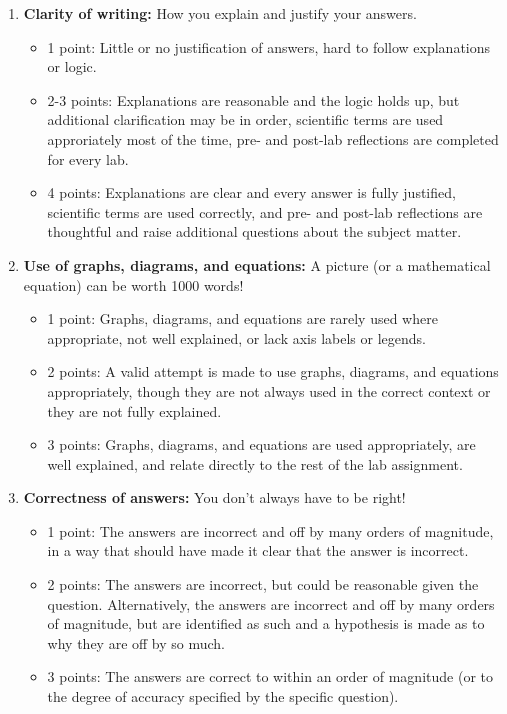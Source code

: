 \documentclass[10pt]{article}
\begin{document}
\begin{enumerate}
\item \textbf{Clarity of writing:} How you explain and justify your answers.
\begin{itemize}
	\item 1 point: Little or no justification of answers, hard to follow explanations or logic.
	\item 2-3 points: Explanations are reasonable and the logic holds up, but additional clarification may be in order, scientific terms are used approriately most of the time, pre- and post-lab reflections are completed for every lab.
	\item 4 points: Explanations are clear and every answer is fully justified, scientific terms are used correctly, and pre- and post-lab reflections are thoughtful and raise additional questions about the subject matter.
\end{itemize}
\item \textbf{Use of graphs, diagrams, and equations:} A picture (or a mathematical equation) can be worth 1000 words!
\begin{itemize}
	\item 1 point: Graphs, diagrams, and equations are rarely used where appropriate, not well explained, or lack axis labels or legends.
	\item 2 points: A valid attempt is made to use graphs, diagrams, and equations appropriately, though they are not always used in the correct context or they are not fully explained.
	\item 3 points: Graphs, diagrams, and equations are used appropriately, are well explained, and relate directly to the rest of the lab assignment.
\end{itemize}
\item \textbf{Correctness of answers:} You don't always have to be right!
\begin{itemize}
	\item 1 point: The answers are incorrect and off by many orders of magnitude, in a way that should have made it clear that the answer is incorrect.
	\item 2 points: The answers are incorrect, but could be reasonable given the question. Alternatively, the answers are incorrect and off by many orders of magnitude, but are identified as such and a hypothesis is made as to why they are off by so much.
	\item 3 points: The answers are correct to within an order of magnitude (or to the degree of accuracy specified by the specific question).
\end{itemize}
\end{enumerate}
\end{document}
